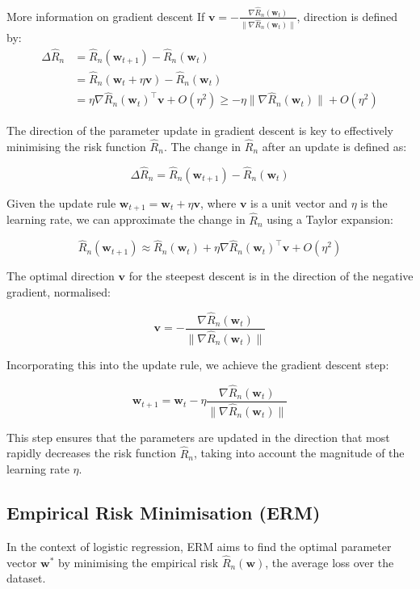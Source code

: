 \begin{sidenotebox}{More information on gradient descent}
If $\mathbf{v}=-\frac{\nabla\hat{R}_{n}(\mathbf{w}_{t})}{\|\nabla\hat{R}_{n}(\mathbf{w}_{t})\|}$, direction is defined by:
\begin{align*}\Delta\hat{R}_{n}&=\hat{R}_{n}(\mathbf{w}_{t+1})-\hat{R}_{n}(\mathbf{w}_{t})\\
&=\hat{R}_{n}(\mathbf{w}_{t}+\eta\mathbf{v})-\hat{R}_{n}(\mathbf{w}_{t})\\
&=\eta\nabla\hat{R}_{n}(\mathbf{w}_{t})^{\top}\mathbf{v}+O(\eta^{2})\geqslant-\eta\|\nabla\hat{R}_{n}(\mathbf{w}_{t})\|+O(\eta^{2})\end{align*}

The direction of the parameter update in gradient descent is key to effectively minimising the risk function \( \hat{R}_n \). The change in \( \hat{R}_n \) after an update is defined as:

\[ \Delta \hat{R}_n = \hat{R}_n(\mathbf{w}_{t+1}) - \hat{R}_n(\mathbf{w}_t) \]

Given the update rule \( \mathbf{w}_{t+1} = \mathbf{w}_t + \eta\mathbf{v} \), where \( \mathbf{v} \) is a unit vector and \( \eta \) is the learning rate, we can approximate the change in \( \hat{R}_n \) using a Taylor expansion:

\[ \hat{R}_n(\mathbf{w}_{t+1}) \approx \hat{R}_n(\mathbf{w}_t) + \eta \nabla \hat{R}_n(\mathbf{w}_t)^\top \mathbf{v} + O(\eta^2) \]

The optimal direction \( \mathbf{v} \) for the steepest descent is in the direction of the negative gradient, normalised:

\[ \mathbf{v} = -\frac{\nabla \hat{R}_n(\mathbf{w}_t)}{\| \nabla \hat{R}_n(\mathbf{w}_t) \|} \]

Incorporating this into the update rule, we achieve the gradient descent step:

\[ \mathbf{w}_{t+1} = \mathbf{w}_t - \eta \frac{\nabla \hat{R}_n(\mathbf{w}_t)}{\| \nabla \hat{R}_n(\mathbf{w}_t) \|} \]

This step ensures that the parameters are updated in the direction that most rapidly decreases the risk function \( \hat{R}_n \), taking into account the magnitude of the learning rate \( \eta \).
\end{sidenotebox}



\subsection{Empirical Risk Minimisation (ERM)}
In the context of logistic regression, ERM aims to find the optimal parameter vector \( \mathbf{w}^* \) by minimising the empirical risk \( \hat{R}_n(\mathbf{w}) \), the average loss over the dataset.


